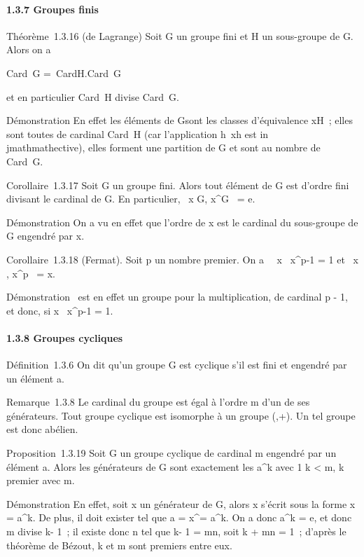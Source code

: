 \paragraph{1.3.7 Groupes finis}

Théorème~1.3.16 (de Lagrange) Soit G un groupe fini et H un sous-groupe
de G. Alors on a

Card~G =\
CardH.Card~G\diagupH

et en particulier Card~H divise
Card~G.

Démonstration En effet les éléments de G\diagupH sont les classes
d'équivalence xH~; elles sont toutes de cardinal
Card~H (car l'application
h\mapsto~xh est in\\jmathmathective), elles forment une
partition de G et sont au nombre de Card~G\diagupH.

Corollaire~1.3.17 Soit G un groupe fini. Alors tout élément de G est
d'ordre fini divisant le cardinal de G. En particulier,
\forall~x \in G, x^G~ =
e.

Démonstration On a vu en effet que l'ordre de x est le cardinal du
sous-groupe de G engendré par x.

Corollaire~1.3.18 (Fermat). Soit p un nombre premier. On a
\forall~~x \in {}\diagupp{}
\diagdown\0\, x^p-1 = 1 et
\forall~x \in \mathbb{Z}\diagupp{}, x^p~ = x.

Démonstration \diagupp{} \diagdown\0\ est en effet
un groupe pour la multiplication, de cardinal p - 1, et donc, si x \in
{}\diagupp\mathbb{Z} \diagdown\0\, x^p-1 = 1.

\paragraph{1.3.8 Groupes cycliques}

Définition~1.3.6 On dit qu'un groupe G est cyclique s'il est fini et
engendré par un élément a.

Remarque~1.3.8 Le cardinal du groupe est égal à l'ordre m d'un de ses
générateurs. Tout groupe cyclique est isomorphe à un groupe (\diagupm{},+). Un
tel groupe est donc abélien.

Proposition~1.3.19 Soit G un groupe cyclique de cardinal m engendré par
un élément a. Alors les générateurs de G sont exactement les
a^k avec 1 \leq k \textless{} m, k premier avec m.

Démonstration En effet, soit x un générateur de G, alors x s'écrit sous
la forme x = a^k. De plus, il doit exister \ell tel que a =
x^\ell = a^k\ell. On a donc a^k = e, et
donc m divise k\ell - 1~; il existe donc n \in {} tel que k\ell - 1 = mn, soit k\ell
+ mn = 1~; d'après le théorème de Bézout, k et m sont premiers entre
eux.


